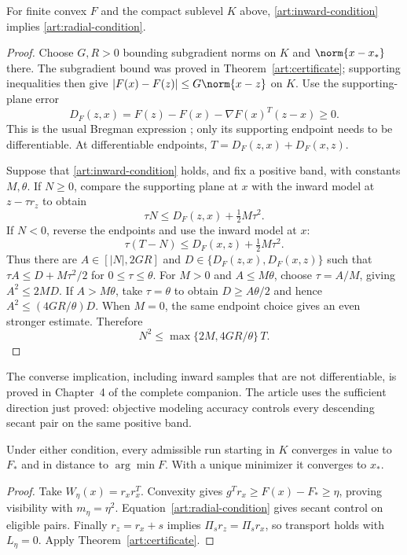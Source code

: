 \begin{theorem}\label{art:radial-equivalence}
For finite convex $F$ and the compact sublevel $K$ above,
\eqref{art:inward-condition} implies \eqref{art:radial-condition}.
\end{theorem}
\begin{proof}
Choose $G,R>0$ bounding subgradient norms on $K$ and $\norm{x-x_*}$ there.
The subgradient bound was proved in Theorem~\ref{art:certificate}; supporting
inequalities then give $|F(x)-F(z)|\le G\norm{x-z}$ on $K$.
Use the supporting-plane error
\[
 D_F(z,x)=F(z)-F(x)-\nabla F(x)^T(z-x)\ge0.
\]
This is the usual Bregman expression \cite{BB}; only its supporting endpoint
needs to be differentiable. At differentiable endpoints,
$T=D_F(z,x)+D_F(x,z)$.

Suppose that \eqref{art:inward-condition} holds, and fix a positive band,
with constants $M,\theta$. If $N\ge0$, compare the supporting plane at $x$
with the inward model at $z-\tau r_z$ to obtain
\[
 \tau N\le D_F(z,x)+\tfrac12M\tau^2.
\]
If $N<0$, reverse the endpoints and use the inward model at $x$:
\[
 \tau(T-N)\le D_F(x,z)+\tfrac12M\tau^2.
\]
Thus there are $A\in[|N|,2GR]$ and
$D\in\{D_F(z,x),D_F(x,z)\}$ such that
$\tau A\le D+M\tau^2/2$ for $0\le\tau\le\theta$.
For $M>0$ and $A\le M\theta$, choose $\tau=A/M$, giving $A^2\le2MD$.
If $A>M\theta$, take $\tau=\theta$ to obtain
$D\ge A\theta/2$ and hence $A^2\le(4GR/\theta)D$.
When $M=0$, the same endpoint choice gives an even stronger estimate.
Therefore
\begin{equation}\label{art:inward-to-radial}
 N^2\le \max\{2M,4GR/\theta\}\,T.
\end{equation}
\end{proof}

The converse implication, including inward samples that are not
differentiable, is proved in Chapter~4 of the complete companion. The article
uses the sufficient direction just proved: objective modeling accuracy
controls every descending secant pair on the same positive band.

\begin{corollary}\label{art:radial-convergence}
Under either condition, every admissible run starting in $K$
converges in value to $F_*$ and in distance to $\arg\min F$. With a unique
minimizer it converges to $x_*$.
\end{corollary}
\begin{proof}
Take $W_\eta(x)=r_xr_x^T$. Convexity gives
$g^Tr_x\ge F(x)-F_*\ge\eta$, proving visibility with $m_\eta=\eta^2$.
Equation~\eqref{art:radial-condition} gives secant control on eligible pairs.
Finally $r_z=r_x+s$ implies $\Pi_sr_z=\Pi_sr_x$, so transport holds with
$L_\eta=0$. Apply Theorem~\ref{art:certificate}.
\end{proof}


